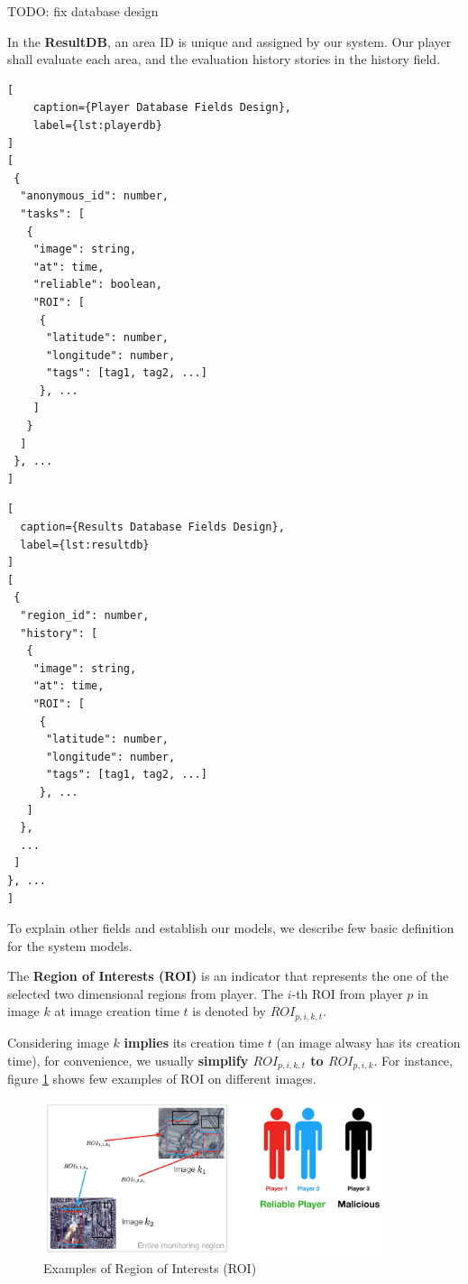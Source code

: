 TODO: fix database design

In the \textbf{ResultDB}, an area ID is unique and assigned by our system. 
Our player shall evaluate each area, and the evaluation history stories in the history field.


\noindent\begin{minipage}{.45\textwidth}
\begin{lstlisting}[
    caption={Player Database Fields Design},
    label={lst:playerdb}
]
[
 {
  "anonymous_id": number,
  "tasks": [
   {
    "image": string,
    "at": time,
    "reliable": boolean,
    "ROI": [
     {
      "latitude": number,
      "longitude": number,
      "tags": [tag1, tag2, ...]
     }, ...
    ]
   }
  ]
 }, ...
]
\end{lstlisting}
\end{minipage}\hfill
\begin{minipage}{.45\textwidth}
\begin{lstlisting}[
  caption={Results Database Fields Design},
  label={lst:resultdb}
]
[
 {
  "region_id": number,
  "history": [
   {
    "image": string,
    "at": time,   
    "ROI": [
     {
      "latitude": number,
      "longitude": number,
      "tags": [tag1, tag2, ...]
     }, ...
   ]
  }, 
  ...
 ]
}, ...
]
\end{lstlisting}
\end{minipage}

To explain other fields and establish our models, we describe few basic definition for the system models.

\begin{definition}
\label{def:roi}
The \textbf{Region of Interests (ROI)} is an indicator that represents the one of the selected two dimensional regions from player. 
The $i$-th ROI from player $p$ in image $k$ at image creation time $t$ is denoted by $ROI_{p,i,k,t}$.
\end{definition}

Considering image $k$ \textbf{implies} its creation time $t$ (an image alwasy has its creation time), for convenience, 
we usually \textbf{simplify $ROI_{p,i,k,t}$ to $ROI_{p,i,k}$}.
For instance, figure \ref{fig:roi} shows few examples of ROI on different images.

\begin{figure}[htp]
\centering
\includegraphics[width=0.9\textwidth]{figures/roi}
\caption{Examples of Region of Interests (ROI)}
\label{fig:roi}
\end{figure}

